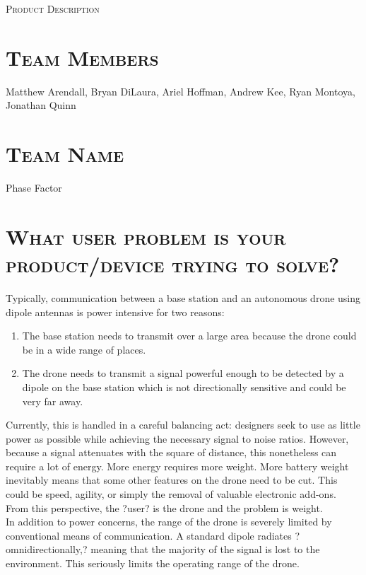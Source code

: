 \documentclass[11pt]{article}
\numberwithin{figure}{section}
\begin{document}
\begin{center}
	\textsc{\Large Product Description}\\
	\hrulefill 
\end{center}

\section{\textsc{Team Members}}
	Matthew Arendall, Bryan DiLaura, Ariel Hoffman, Andrew Kee, Ryan Montoya, Jonathan Quinn
	
\section{\textsc{Team Name}}
	Phase Factor
	
\section{\textsc{What user problem is your product/device trying to solve?}}
	Typically, communication between a base station and an autonomous drone using dipole antennas is power intensive for two reasons: 
	\begin{enumerate}
		\item The base station needs to transmit over a large area because the drone could be in a wide range of places.
		\item The drone needs to transmit a signal powerful enough to be detected by a dipole on the base station which is not directionally sensitive and could be very far away.
	\end{enumerate}
	Currently, this is handled in a careful balancing act: designers seek to use as little power as possible while achieving the necessary signal to noise ratios. However, because a signal attenuates with the square of distance, this nonetheless can require a lot of energy.  More energy requires more weight. More battery weight inevitably means that some other features on the drone need to be cut. This could be speed, agility, or simply the removal of valuable electronic add-ons. From this perspective, the ?user? is the drone and the problem is weight. \\
	
	In addition to power concerns, the range of the drone is severely limited by conventional means of communication.  A standard dipole radiates ?omnidirectionally,? meaning that the majority of the signal is lost to the environment.  This seriously limits the operating range of the drone.  \\
	
\end{document}

